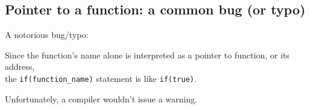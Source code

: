 \subsection{Pointer to a function: a common bug (or typo)}

A notorious bug/typo:



Since the function's name alone is interpreted as a pointer to function, or its address,\\
the \verb|if(function_name)| statement is like \verb|if(true)|.

Unfortunately, a \CCpp compiler wouldn't issue a warning.

